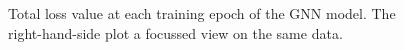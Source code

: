 \documentclass[
	fontsize=10pt, %
	twoside=false, %
	secnumdepth=1, %
  toc=indentunnumbered %
]{kaobook}
\begin{document}

\begin{figure}[h]
  \centering
  \begin{subfigure}[h]{0.49\linewidth}
  \end{subfigure}
  \begin{subfigure}[h]{0.49\linewidth}
  \end{subfigure}
  \caption{Total loss value at each training epoch of the GNN model. The right-hand-side plot a
    focussed view on the same data.}
  \label{fig:svm-repro-loss}
\end{figure}




\end{document}
